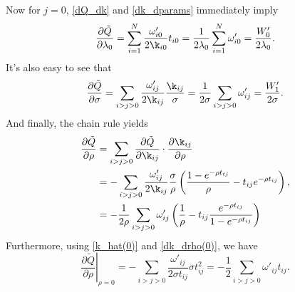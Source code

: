 \documentclass[12pt,leqno]{article}
\begin{document}
Now for $j = 0$,  \eqref{dQ_dk} and \eqref{dk_dparams} immediately imply
\begin{equation}\label{dQ_dlambda}
\frac{\partial\tilde{Q}}{\partial\lambda_0} = \sum_{i=1}^N\frac{\omega'_{i0}}{2\k_{i0}}t_{i0} 
= \frac{1}{2\lambda_0}\sum_{i=1}^N\omega'_{i0} = \frac{W'_0}{2\lambda_0}.
\end{equation}
It's also easy to see that
\begin{equation}\label{dQ_dsigma}
  \frac{\partial\tilde{Q}}{\partial\sigma} = \sum_{i>j>0}\frac{\omega'_{ij}}{2\k_{ij}}\frac{\k_{ij}}{\sigma} 
= \frac{1}{2\sigma}\sum_{i>j>0}\omega'_{ij} = \frac{W'_1}{2\sigma}.
\end{equation}
And finally, the chain rule yields
\begin{equation}\label{dQ_drho}
\begin{split}
  \frac{\partial\tilde{Q}}{\partial\rho} &= \sum_{i>j>0}\frac{\partial\tilde{Q}}{\partial\k_{ij}}\cdot
  \frac{\partial\k_{ij}}{\partial\rho}\\
&= -\sum_{i>j>0}\frac{\omega'_{ij}}{2\k_{ij}}\frac{\sigma}{\rho}\left(\frac{1-e^{-\rho{t_{tj}}}}{\rho} - t_{ij}e^{-\rho{t_{ij}}}\right), \\
&= -\frac{1}{2\rho}\sum_{i>j>0}\omega'_{ij}\left(\frac{1}{\rho} - t_{ij}\frac{e^{-\rho{t_{ij}}}}{1-e^{-\rho t_{ij}}}\right)\\
\end{split}
\end{equation}
Furthermore, using \eqref{k_hat(0)} and \eqref{dk_drho(0)}, we have
\begin{equation}\label{dQ_drho(0)}
  \left.\frac{\partial\tilde{Q}}{\partial\rho}\right|_{\rho=0} = -\sum_{i>j>0}\frac{\omega'_{ij}}{2\sigma t_{ij}}\sigma t_{ij}^2 = -\frac{1}{2}\sum_{i>j>0}\omega'_{ij}t_{ij}.
\end{equation}
    
    
\end{document}
